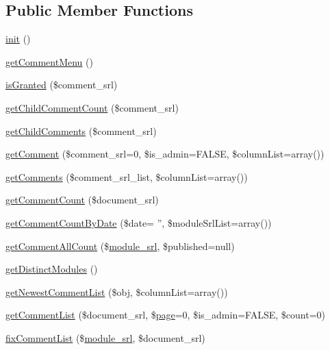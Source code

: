 \subsection*{Public Member Functions}
\begin{DoxyCompactItemize}
\item 
\hyperlink{classcommentModel_a4da59f10ea425e61dbd5bebe73ab9ec1}{init} ()
\item 
\hyperlink{classcommentModel_a74e52809b658711e8d63ba7900eb5246}{get\+Comment\+Menu} ()
\item 
\hyperlink{classcommentModel_aff0bb9049c29d3795fbe2c7eb92a2451}{is\+Granted} (\$comment\+\_\+srl)
\item 
\hyperlink{classcommentModel_adfb890eecf72a039c9f7a28c1e6eb3d2}{get\+Child\+Comment\+Count} (\$comment\+\_\+srl)
\item 
\hyperlink{classcommentModel_ac1acb7d6d8da68e20ec5e6e5a55e5d32}{get\+Child\+Comments} (\$comment\+\_\+srl)
\item 
\hyperlink{classcommentModel_adc900f3123da26b591a20ca7a951e4ac}{get\+Comment} (\$comment\+\_\+srl=0, \$is\+\_\+admin=F\+A\+L\+S\+E, \$column\+List=array())
\item 
\hyperlink{classcommentModel_a435e77a0e774c5b6ba899312e8bea2dd}{get\+Comments} (\$comment\+\_\+srl\+\_\+list, \$column\+List=array())
\item 
\hyperlink{classcommentModel_af28e4e312fad244148fd96bd0e8f0b5f}{get\+Comment\+Count} (\$document\+\_\+srl)
\item 
\hyperlink{classcommentModel_a29b3a6403c25f503f3fb91b4329542ee}{get\+Comment\+Count\+By\+Date} (\$date= '', \$module\+Srl\+List=array())
\item 
\hyperlink{classcommentModel_a6d868da113e98ecde6c6e5cb12ce4cbf}{get\+Comment\+All\+Count} (\$\hyperlink{ko_8install_8php_a370bb6450fab1da3e0ed9f484a38b761}{module\+\_\+srl}, \$published=null)
\item 
\hyperlink{classcommentModel_a4f202e4238ab75645a10db6acaa1f969}{get\+Distinct\+Modules} ()
\item 
\hyperlink{classcommentModel_a89492b8f475e42296e1560b8886bdc01}{get\+Newest\+Comment\+List} (\$obj, \$column\+List=array())
\item 
\hyperlink{classcommentModel_ae43f36bfd32d39f87dac358aa1526f7f}{get\+Comment\+List} (\$document\+\_\+srl, \$\hyperlink{classpage}{page}=0, \$is\+\_\+admin=F\+A\+L\+S\+E, \$count=0)
\item 
\hyperlink{classcommentModel_af9457d8f1128af78c79ea416d591fc13}{fix\+Comment\+List} (\$\hyperlink{ko_8install_8php_a370bb6450fab1da3e0ed9f484a38b761}{module\+\_\+srl}, \$document\+\_\+srl)

\end{DoxyCompactItemize}
